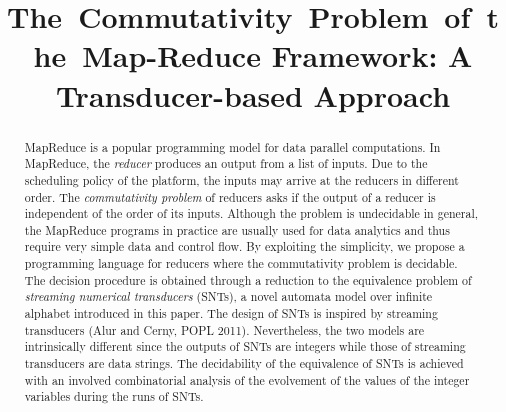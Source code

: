 \documentclass[runningheads,a4paper]{llncs}
\title{The~Commutativity~Problem~of~the~Map-Reduce Framework: A Transducer-based Approach}
\author{}
\institute{}
\begin{document}
\maketitle

\begin{abstract}

MapReduce is a popular programming model for data parallel computations. 
In MapReduce, the \emph{reducer} produces an output from a list of inputs. Due to the scheduling policy of the platform, the inputs may arrive at the reducers in different order. The \emph{commutativity problem} of reducers asks if the output of a reducer is independent of the order of its inputs. Although the problem is undecidable in general,
the MapReduce programs in practice are usually used for data analytics and thus require very simple data and control flow. 
By exploiting the simplicity, we propose a programming language for reducers where the commutativity problem is decidable.
The decision procedure is obtained through a reduction to the equivalence problem of \emph{streaming numerical transducers} (SNTs), a novel automata model over infinite alphabet introduced in this paper. The design of SNTs is inspired by streaming transducers (Alur and Cerny, POPL 2011). Nevertheless, the two models are intrinsically different since the outputs of SNTs are integers while those of streaming transducers are data strings. 
The decidability of the equivalence of SNTs is achieved with an involved combinatorial analysis of the evolvement of the values of the integer variables during the runs of SNTs.
\end{abstract}



















\newpage


\end{document}
